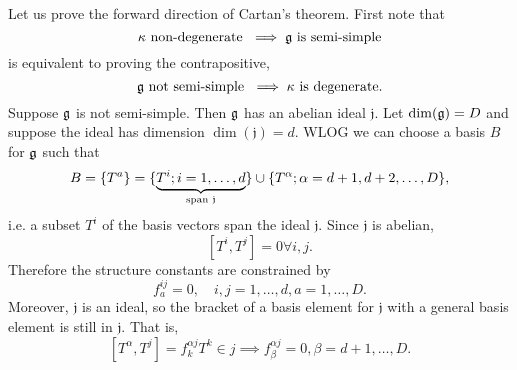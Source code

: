 Let us prove the forward direction of Cartan's theorem. First note that $$\kappa\text{ non-degenerate }\implies \mathfrak{g}\text{ is semi-simple}$$ is equivalent to proving the contrapositive, 
$$\mathfrak{g}\text{ not semi-simple }\implies \kappa\text{ is degenerate}.$$
Suppose $\mathfrak{g}$ is not semi-simple. Then $\mathfrak{g}$ has an abelian ideal $\mathfrak{j}.$ Let $\dim(\mathfrak{g})=D$ and suppose the ideal has dimension $\dim(\mathfrak{j})=d.$ WLOG we can choose a basis $B$ for $\mathfrak{g}$ such that
$$B=\{T^a\} =\{\underbrace{T^i; i=1,\ldots,d}_{\text{span }\mathfrak{j}}\}\cup \{T^\alpha;\alpha=d+1,d+2,\ldots, D\},$$
i.e. a subset $T^i$ of the basis vectors span the ideal $\mathfrak{j}.$ Since $\mathfrak{j}$ is abelian,
$$[T^i,T^j]=0\forall i,j.$$ Therefore the structure constants are constrained by
$$f^{ij}_a = 0,\quad i,j=1,\ldots, d, a=1,\ldots,D.$$
Moreover, $\mathfrak{j}$ is an ideal, so the bracket of a basis element for $\mathfrak{j}$ with a general basis element is still in $\mathfrak{j}.$ That is,
$$[T^\alpha,T^j]=f^{\alpha j}_k T^k \in j \implies f^{\alpha j}_\beta=0, \beta = d+1,\ldots,D.$$